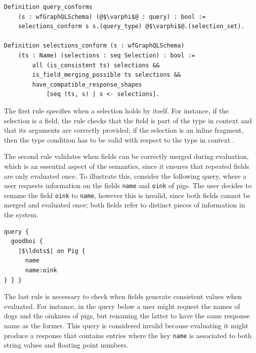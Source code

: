 \begin{verbatim}
Definition query_conforms 
    (s : wfGraphQLSchema) (@$\varphi$@ : query) : bool :=
    selections_conform s s.(query_type) @$\varphi$@.(selection_set).
    
Definition selections_conform (s : wfGraphQLSchema)
    (ts : Name) (selections : seq Selection) : bool :=
        all (is_consistent ts) selections &&
        is_field_merging_possible ts selections &&
        have_compatible_response_shapes
            [seq (ts, s) | s <- selections].

\end{verbatim}

The first rule specifies when a selection holds by itself. For instance, if the selection is a field, the rule checks that the field is part of the type in context and that its arguments are correctly provided; if the selection is an inline fragment, then the type condition has to be valid with respect to the type in context .%

The second rule validates when fields can be correctly merged during evaluation, which is an essential aspect of the semantics, since it ensures that repeated fields are only evaluated once. To illustrate this, consider the following query, where a user requests information on the fields \texttt{name} and \texttt{oink} of pigs. The user decides to rename the field \texttt{oink} to \texttt{name}, however this is invalid, since both fields cannot be merged and evaluated once; both fields refer to distinct pieces of information in the system.

\begin{verbatim}
query {
  goodboi {
    |$\ldots$| on Pig {
	  name
	  name:oink
} } }
\end{verbatim}

The last rule is necessary to check when fields generate consistent values when evaluated. For instance, in the query below a user might request the names of dogs and the oinkness of pigs, but renaming the latter to have the same response name as the former. This query is considered invalid because evaluating it might produce a response that contains entries where the key \texttt{name} is associated to both string values and floating point numbers. 

